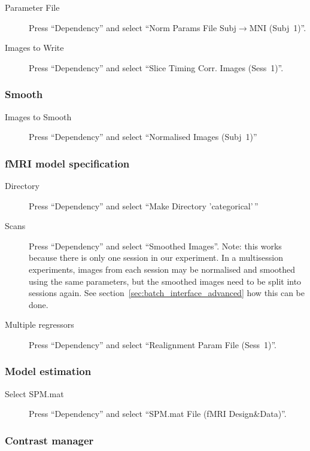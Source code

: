 \begin{description}
\item[Parameter File] Press ``Dependency'' and select ``Norm Params File
  Subj$\rightarrow$MNI (Subj~1)''.
\item[Images to Write] Press ``Dependency'' and select ``Slice Timing
  Corr. Images (Sess~1)''. 
\end{description}

\subsubsection*{Smooth}

\begin{description}
\item[Images to Smooth] Press ``Dependency'' and select ``Normalised Images
  (Subj~1)''
\end{description}

\subsubsection*{fMRI model specification}

\begin{description}
\item[Directory] Press ``Dependency'' and select ``Make Directory
  'categorical'\,''
\item[Scans] Press ``Dependency'' and select ``Smoothed Images''. Note: this
  works because there is only one session in our experiment. In a
  multisession experiments, images from each session may be normalised and
  smoothed using the same parameters, but the smoothed images need to be
  split into sessions again. See section~\ref{sec:batch_interface_advanced}
  how this can be done.
\item[Multiple regressors] Press ``Dependency'' and select ``Realignment
  Param File (Sess~1)''.
\end{description}

\subsubsection*{Model estimation}

\begin{description}
\item[Select SPM.mat] Press ``Dependency'' and select ``SPM.mat File (fMRI
  Design\&Data)''.
\end{description}

\subsubsection*{Contrast manager}

